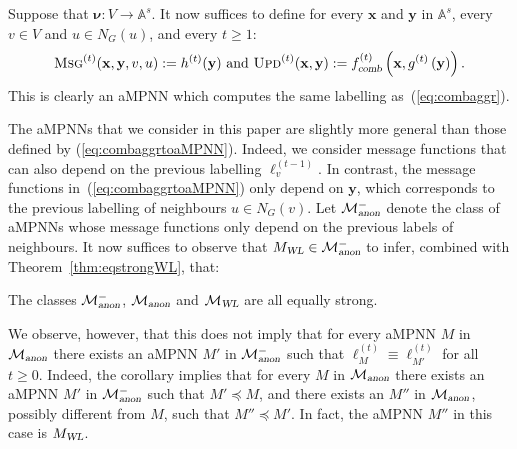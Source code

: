 Suppose that
$\pmb{\nu}:V\to\mathbb{A}^s$. It now suffices to define for every $\mathbf{x}$ and $\mathbf{y}$ in $\mathbb{A}^s$, every $v\in V$ and $u\in N_G(u)$, and every $t\geq 1$:
\begin{equation}
\textsc{Msg}^{(t)}(\mathbf{x},\mathbf{y},v,u):=h^{(t)}(\mathbf{y}) \text{ and } \textsc{Upd}^{(t)}(\mathbf{x},\mathbf{y}):=f_{\textsl{comb}}^{(t)}\left(\mathbf{x},g^{(t)}\left(\mathbf{y}\right)\right).\label{eq:combaggrtoaMPNN}
\end{equation}
This is clearly an aMPNN which computes the same labelling as~(\ref{eq:combaggr}).

The aMPNNs that we consider in this paper are slightly more general than those defined by
(\ref{eq:combaggrtoaMPNN}). Indeed, we consider message functions that can also depend on the previous labelling $\pmb{\ell}_v^{(t-1)}$. In contrast, the message functions in~(\ref{eq:combaggrtoaMPNN}) only depend on $\mathbf{y}$, which corresponds to the previous labelling of neighbours $u\in N_G(v)$. Let $\mathcal{M}{}^{-}_{\textsl{anon}}$ denote the class of aMPNNs whose message functions only
depend on the previous labels of neighbours. It now suffices to observe that
 $M_{\textsl{WL}}\in \mathcal{M}{}^{-}_{\textsl{anon}}$ to infer,  combined with Theorem~\ref{thm:eqstrongWL}, that:
 \begin{corollary}
	 The classes $\mathcal{M}{}^{-}_{\textsl{anon}}$, $\mathcal{M}_{\textsl{anon}}$ and $\mathcal{M}_{\textsl{WL}}$ are all equally strong.
 \end{corollary}
We observe, however, that this does not imply that for every aMPNN $M$ in $\mathcal{M}_{\textsl{anon}}$ there exists an aMPNN $M'$ in $\mathcal{M}{}^{-}_{\textsl{anon}}$
such that $\pmb{\ell}_{M}^{(t)}\equiv \pmb{\ell}_{M'}^{(t)}$ for all $t\geq 0$.
Indeed, the corollary implies that for every $M$ in $\mathcal{M}_{\textsl{anon}}$ there exists an aMPNN $M'$ in $\mathcal{M}{}^{-}_{\textsl{anon}}$ such that $M'\preceq M$, and there exists an $M''$ in $\mathcal{M}_{\textsl{anon}}$, possibly different from $M$, such that $M''\preceq M'$. In fact, the aMPNN $M''$ in this case is $M_{\textsl{WL}}$.
